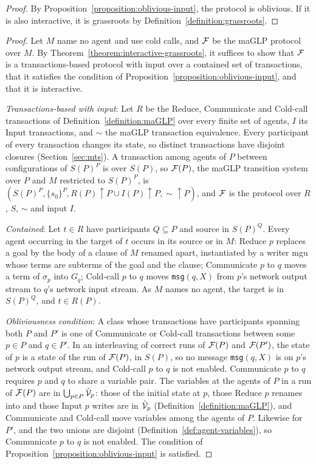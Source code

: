 \thmInteractiveGrassroots*

\begin{proof}
By Proposition~\ref{proposition:oblivious-input}, the protocol is oblivious. If it is also interactive, it is grassroots by Definition~\ref{definition:grassroots}.
\end{proof}

\thmMaGLPGrassroots*

\begin{proof}
Let $M$ name no agent and use cold calls, and $\mathcal{F}$ be the maGLP protocol over $M$. By Theorem~\ref{theorem:interactive-grassroots}, it suffices to show that $\mathcal{F}$ is a transactions-based protocol with input over a contained set of transactions, that it satisfies the condition of Proposition~\ref{proposition:oblivious-input}, and that it is interactive.

\emph{Transactions-based with input}: Let $R$ be the Reduce, Communicate and Cold-call transactions of Definition~\ref{definition:maGLP} over every finite set of agents, $I$ its Input transactions, and $\sim$ the maGLP transaction equivalence. Every participant of every transaction changes its state, so distinct transactions have disjoint closures (Section~\ref{sec:mts}). A transaction among agents of $P$ between configurations of $S(P)^P$ is over $S(P)$, so $\mathcal{F}(P)$, the maGLP transition system over $P$ and $M$ restricted to $S(P)^P$, is $(S(P)^P, \{s_0\}^P, R(P){\uparrow}P \cup I(P){\uparrow}P, {\sim}{\uparrow}P)$, and $\mathcal{F}$ is the protocol over $R$, $S$, $\sim$ and input $I$.

\emph{Contained}: Let $t \in R$ have participants $Q \subseteq P$ and source in $S(P)^Q$. Every agent occurring in the target of $t$ occurs in its source or in $M$: Reduce $p$ replaces a goal by the body of a clause of $M$ renamed apart, instantiated by a writer mgu whose terms are subterms of the goal and the clause; Communicate $p$ to $q$ moves a term of $\sigma_p$ into $G_q$; Cold-call $p$ to $q$ moves \verb|msg|$(q, X)$ from $p$'s network output stream to $q$'s network input stream. As $M$ names no agent, the target is in $S(P)^Q$, and $t \in R(P)$.

\emph{Obliviousness condition}: A class whose transactions have participants spanning both $P$ and $P'$ is one of Communicate or Cold-call transactions between some $p \in P$ and $q \in P'$. In an interleaving of correct runs of $\mathcal{F}(P)$ and $\mathcal{F}(P')$, the state of $p$ is a state of the run of $\mathcal{F}(P)$, in $S(P)$, so no message \verb|msg|$(q, X)$ is on $p$'s network output stream, and Cold-call $p$ to $q$ is not enabled. Communicate $p$ to $q$ requires $p$ and $q$ to share a variable pair. The variables at the agents of $P$ in a run of $\mathcal{F}(P)$ are in $\bigcup_{p \in P}\hat{\mathcal{V}}_p$: those of the initial state at $p$, those Reduce $p$ renames into and those Input $p$ writes are in $\hat{\mathcal{V}}_p$ (Definition~\ref{definition:maGLP}), and Communicate and Cold-call move variables among the agents of $P$. Likewise for $P'$, and the two unions are disjoint (Definition~\ref{def:agent-variables}), so Communicate $p$ to $q$ is not enabled. The condition of Proposition~\ref{proposition:oblivious-input} is satisfied.


\end{proof}
